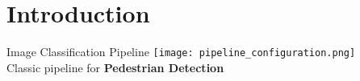 \section{Introduction}

\begin{frame}[plain]
\end{frame}

\begin{frame}{Image Classification Pipeline}
\centering
\texttt{[image: pipeline\_configuration.png]}\\
\small
Classic pipeline for \textbf{Pedestrian Detection}
\end{frame}

